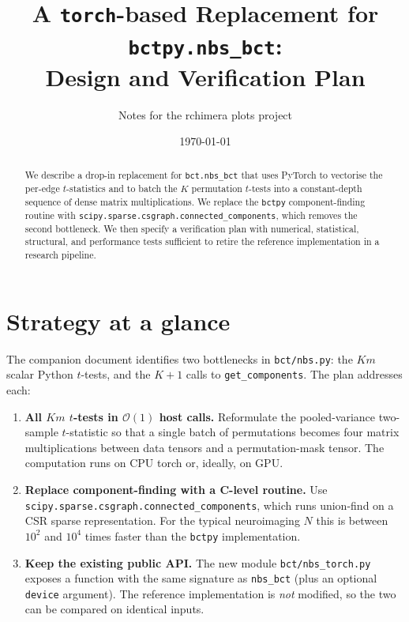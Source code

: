 \documentclass[11pt]{article}
\title{A \texttt{torch}-based Replacement for \texttt{bctpy.nbs\_bct}:\\
Design and Verification Plan}
\author{Notes for the rchimera plots project}
\date{\today}
\begin{document}
\maketitle

\begin{abstract}
We describe a drop-in replacement for \texttt{bct.nbs\_bct} that uses PyTorch to vectorise the per-edge $t$-statistics and to batch the $K$ permutation $t$-tests into a constant-depth sequence of dense matrix multiplications. We replace the \texttt{bctpy} component-finding routine with \texttt{scipy.sparse.csgraph.connected\_components}, which removes the second bottleneck. We then specify a verification plan with numerical, statistical, structural, and performance tests sufficient to retire the reference implementation in a research pipeline.
\end{abstract}

\tableofcontents
\bigskip

\section{Strategy at a glance}

The companion document identifies two bottlenecks in \texttt{bct/nbs.py}: the $K m$ scalar Python $t$-tests, and the $K{+}1$ calls to \texttt{get\_components}. The plan addresses each:

\begin{enumerate}[leftmargin=2.0em]
\item \textbf{All $K m$ $t$-tests in $\mathcal{O}(1)$ host calls.} Reformulate the pooled-variance two-sample $t$-statistic so that a single batch of permutations becomes four matrix multiplications between data tensors and a permutation-mask tensor. The computation runs on CPU torch or, ideally, on GPU.

\item \textbf{Replace component-finding with a C-level routine.} Use \texttt{scipy.sparse.csgraph.connected\_components}, which runs union-find on a CSR sparse representation. For the typical neuroimaging $N$ this is between $10^2$ and $10^4$ times faster than the \texttt{bctpy} implementation.

\item \textbf{Keep the existing public API.} The new module \texttt{bct/nbs\_torch.py} exposes a function with the same signature as \texttt{nbs\_bct} (plus an optional \texttt{device} argument). The reference implementation is \emph{not} modified, so the two can be compared on identical inputs.
\end{enumerate}
\end{document}
